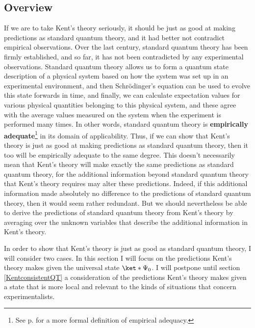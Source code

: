 \documentclass[12pt]{report}
\begin{document}
\subsection{Overview}
If we are to take Kent's theory seriously, it should be just as good at making predictions as standard quantum theory, and it had better not contradict empirical observations. Over the last century, standard quantum theory has been firmly established, and so far, it has not been contradicted by any experimental observations. Standard quantum theory allows us to form a quantum state description of a physical system based on how the system was set up in an experimental environment, and then Schr\"{o}dinger's equation can be used to evolve this state forwards in time, and finally, we can calculate expectation values for various physical quantities belonging to this physical system, and these agree with the average values measured on the system when the experiment is performed many times. In other words, standard quantum theory is \textbf{empirically adequate}\footnote{See p. \pageref{adeq} for a more formal definition of empirical adequacy.} in its domain of applicability. Thus, if we can show that Kent's theory is just as good at making predictions as standard quantum theory, then it too will be empirically adequate to the same degree. This doesn't necessarily mean that Kent's theory will make exactly the same predictions as standard quantum theory, for the additional information  beyond standard quantum theory that Kent's theory requires may alter these predictions. Indeed, if this additional information made absolutely no difference to the predictions of standard quantum theory, then it would seem rather redundant. But we should nevertheless be able to derive the predictions of standard quantum theory from Kent's theory by averaging over the unknown variables that describe the additional information in Kent's theory.  

In order to show that Kent's theory is just as good as standard quantum theory, I will consider two cases. In this section I will focus on the predictions Kent's theory makes given the universal state $\ket*{\Psi_0}$. I will postpone until section \ref{KentconsistentQT} a consideration of the predictions Kent's theory makes given a state that is more local and relevant to the kinds of situations that concern experimentalists. 
\end{document}
